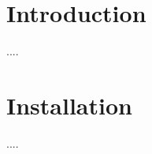 \hypertarget{index_intro_sec}{}\section{Introduction}\label{index_intro_sec}
\begin{DoxyVerb}     ....
\end{DoxyVerb}
\hypertarget{index_install_sec}{}\section{Installation}\label{index_install_sec}
\begin{DoxyVerb}     ....\end{DoxyVerb}
 